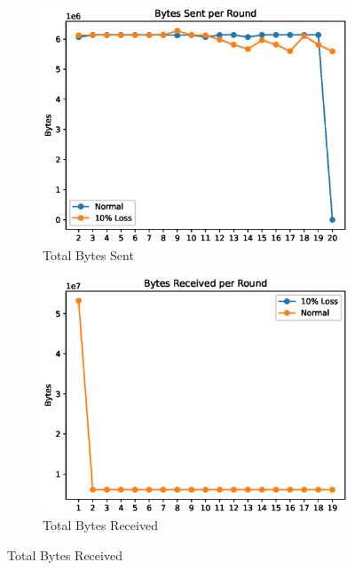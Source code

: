 \documentclass[12pt]{article}
\begin{document}
\begin{figure}
\begin{subfigure}{.475\linewidth}
  \includegraphics[width=\linewidth]{bytes-sent}
  \caption{Total Bytes Sent}
  \label{fig:bytes-sent}
\end{subfigure}\hfill
\begin{subfigure}{.475\linewidth}
  \includegraphics[width=\linewidth]{bytes-recv}
  \caption{Total Bytes Received}
  \label{fig:bytes-recv}
\end{subfigure}\hfill


\end{figure}
\end{document}
